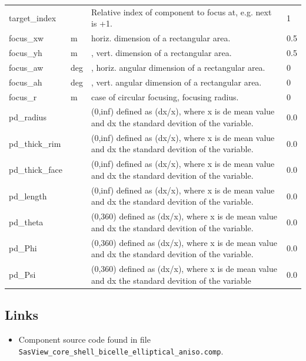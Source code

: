 \begin{longtable}{p{}p{}p{}p{}}
target\_index &   & Relative index of component to focus at, e.g. next is +1. & 1 \\
focus\_xw & m & horiz. dimension of a rectangular area. & 0.5 \\
focus\_yh & m & , vert. dimension of a rectangular area. & 0.5 \\
focus\_aw & deg & , horiz. angular dimension of a rectangular area. & 0 \\
focus\_ah & deg & , vert. angular dimension of a rectangular area. & 0 \\
focus\_r & m & case of circular focusing, focusing radius. & 0 \\
pd\_radius &  & (0,inf) defined as (dx/x), where x is de mean value and dx the standard devition of the variable. & 0.0 \\
pd\_thick\_rim &  & (0,inf) defined as (dx/x), where x is de mean value and dx the standard devition of the variable. & 0.0 \\
pd\_thick\_face &  & (0,inf) defined as (dx/x), where x is de mean value and dx the standard devition of the variable. & 0.0 \\
pd\_length &  & (0,inf) defined as (dx/x), where x is de mean value and dx the standard devition of the variable. & 0.0 \\
pd\_theta &  & (0,360) defined as (dx/x), where x is de mean value and dx the standard devition of the variable. & 0.0 \\
pd\_Phi &  & (0,360) defined as (dx/x), where x is de mean value and dx the standard devition of the variable. & 0.0 \\
pd\_Psi &  & (0,360) defined as (dx/x), where x is de mean value and dx the standard devition of the variable & 0.0 \\
\bottomrule
\end{longtable}

\subsection*{Links}
\begin{itemize}
  \item Component source code found in file \texttt{SasView\_core\_shell\_bicelle\_elliptical\_aniso.comp}.
\end{itemize}
